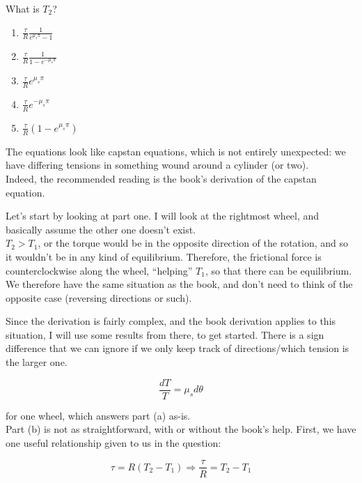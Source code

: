 \documentclass[8.01x]{subfiles}
\begin{document}
What is $T_2$?

\begin{enumerate}
\item $\displaystyle \frac{\tau}{R} \frac{1}{e^{\mu_s \pi} - 1}$
\item $\displaystyle \frac{\tau}{R} \frac{1}{1 - e^{-\mu_s \pi}}$
\item $\displaystyle \frac{\tau}{R} e^{\mu_s \pi}$
\item $\displaystyle \frac{\tau}{R} e^{-\mu_s \pi}$
\item $\displaystyle \frac{\tau}{R} (1 - e^{\mu_s \pi})$
\end{enumerate}

The equations look like capstan equations, which is not entirely unexpected: we have differing tensions in something wound around a cylinder (or two).\\
Indeed, the recommended reading is the book's derivation of the capstan equation.

Let's start by looking at part one. I will look at the rightmost wheel, and basically assume the other one doesn't exist.\\
$T_2 > T_1$, or the torque would be in the opposite direction of the rotation, and so it wouldn't be in any kind of equilibrium. Therefore, the frictional force is counterclockwise along the wheel, ``helping'' $T_1$, so that there can be equilibrium.\\
We therefore have the same situation as the book, and don't need to think of the opposite case (reversing directions or such).

Since the derivation is fairly complex, and the book derivation applies to this situation, I will use some results from there, to get started. There is a sign difference that we can ignore if we only keep track of directions/which tension is the larger one.

\begin{equation}
\frac{dT}{T} = \mu_s d \theta
\end{equation}

for one wheel, which answers part (a) as-is.\\
Part (b) is not as straightforward, with or without the book's help. First, we have one useful relationship given to us in the question:

\begin{equation}
\tau = R(T_2 - T_1) \Rightarrow \frac{\tau}{R} = T_2 - T_1
\end{equation}
\end{document}
